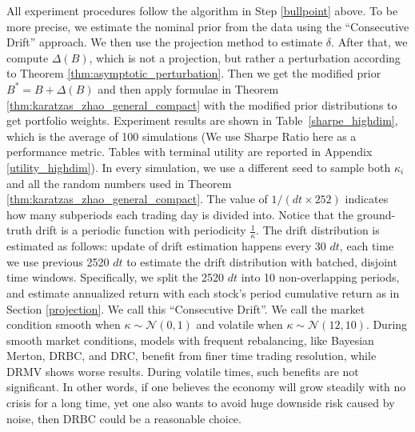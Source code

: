 \documentclass[11pt]{article}
\theoremstyle{definition}
\begin{document}
All experiment procedures follow the algorithm in Step \eqref{bullpoint} above. To be more precise, we estimate {the nominal prior} from the data using the “Consecutive Drift” approach. We then use the projection method to estimate $\delta$. After that, we compute $\Delta(B)$, which is not a projection, but rather a perturbation according to Theorem \ref{thm:asymptotic_perturbation}. Then we get the modified prior $B^*=B+\Delta(B)$ and then apply formulae in Theorem \ref{thm:karatzas_zhao_general_compact} with the modified prior distributions to get portfolio weights. Experiment results are shown in Table~\ref{sharpe_highdim}, which is the average of 100 simulations (We use Sharpe Ratio here as a performance metric. Tables with terminal utility are reported in Appendix \ref{utility_highdim}).  In every simulation, we use a different seed to sample both $\kappa_i$ and all the random numbers used in Theorem \ref{thm:karatzas_zhao_general_compact}. The value of \(1/(dt\times252)\) indicates how many subperiods each trading day is divided into. Notice that the ground-truth drift is a periodic function with periodicity $\frac{1}{\kappa}$. The drift distribution is estimated as follows: update of drift estimation happens every 30 $dt$, each time we use previous 2520 $dt$ to estimate the drift distribution with batched, disjoint time windows. Specifically, we split the 2520 $dt$ into 10 non-overlapping periods, and estimate annualized return with each stock's period cumulative return as in Section \ref{projection}. We call this “Consecutive Drift”. We call the market condition smooth when $\kappa \sim \mathcal{N}(0,1)$ and volatile when $\kappa \sim \mathcal{N}(12,10)$. During smooth market conditions, models with frequent rebalancing, like Bayesian Merton, DRBC, and DRC, benefit from finer time trading resolution, while DRMV shows worse results. During volatile times, such benefits are not significant. In other words, if one believes the economy will grow steadily with no crisis for a long time, yet one also wants to avoid huge downside risk caused by noise, then DRBC could be a reasonable choice.
\end{document}
